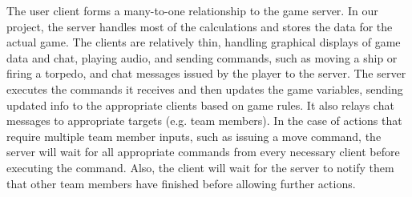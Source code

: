 The user client forms a many-to-one relationship to the game server. In our project, the server handles most of the calculations and stores the data for the actual game. The clients are relatively thin, handling graphical displays of game data and chat, playing audio, and sending commands, such as moving a ship or firing a torpedo, and chat messages issued by the player to the server. The server executes the commands it receives and then updates the game variables, sending updated info to the appropriate clients based on game rules. It also relays chat messages to appropriate targets (e.g. team members). In the case of  actions that require multiple team member inputs, such as issuing a move command, the server will wait for all appropriate commands from every necessary client before executing the command. Also, the client will wait for the server to notify them that other team members have finished before allowing further actions.
